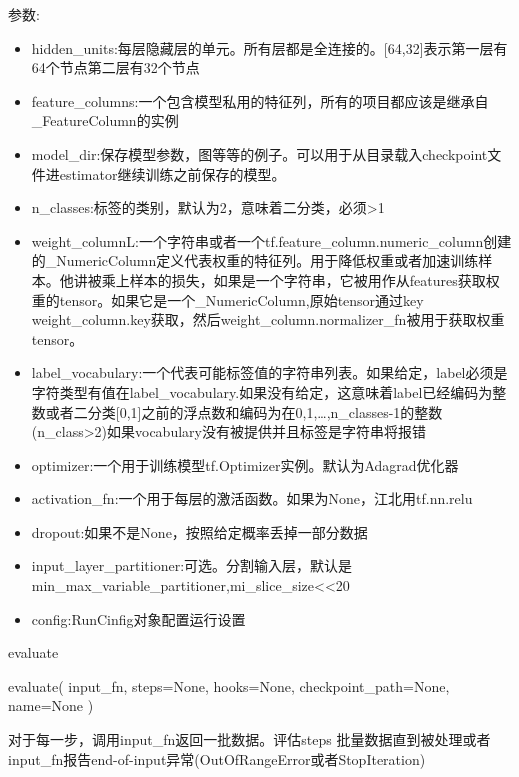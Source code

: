 参数:
\begin{itemize}
	\item hidden\_units:每层隐藏层的单元。所有层都是全连接的。[64,32]表示第一层有64个节点第二层有32个节点
	\item feature\_columns:一个包含模型私用的特征列，所有的项目都应该是继承自\_FeatureColumn的实例
	\item model\_dir:保存模型参数，图等等的例子。可以用于从目录载入checkpoint文件进estimator继续训练之前保存的模型。
	\item n\_classes:标签的类别，默认为2，意味着二分类，必须>1
	\item weight\_columnL:一个字符串或者一个tf.feature\_column.numeric\_column创建的\_NumericColumn定义代表权重的特征列。用于降低权重或者加速训练样本。他讲被乘上样本的损失，如果是一个字符串，它被用作从features获取权重的tensor。如果它是一个\_NumericColumn,原始tensor通过key weight\_column.key获取，然后weight\_column.normalizer\_fn被用于获取权重tensor。
	\item label\_vocabulary:一个代表可能标签值的字符串列表。如果给定，label必须是字符类型有值在label\_vocabulary.如果没有给定，这意味着label已经编码为整数或者二分类[0,1]之前的浮点数和编码为在{0,1,\ldots,n\_classes-1}的整数(n\_class>2)如果vocabulary没有被提供并且标签是字符串将报错
	\item optimizer:一个用于训练模型tf.Optimizer实例。默认为Adagrad优化器
	\item activation\_fn:一个用于每层的激活函数。如果为None，江北用tf.nn.relu
	\item dropout:如果不是None，按照给定概率丢掉一部分数据
	\item input\_layer\_partitioner:可选。分割输入层，默认是min\_max\_variable\_partitioner,mi\_slice\_size<<20
	\item config:RunCinfig对象配置运行设置
\end{itemize}
evaluate
\begin{python}
evaluate(
    input_fn,
    steps=None,
    hooks=None,
    checkpoint_path=None,
    name=None
)
\end{python}
对于每一步，调用input\_fn返回一批数据。评估steps 批量数据直到被处理或者input\_fn报告end-of-input异常(OutOfRangeError或者StopIteration)

